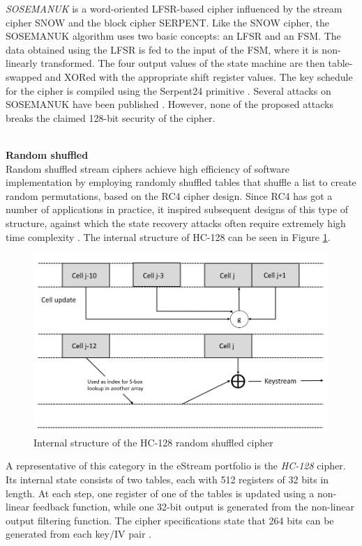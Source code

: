 \emph{SOSEMANUK} is a word-oriented LFSR-based cipher influenced by the stream cipher SNOW and the block cipher SERPENT. Like the SNOW cipher, the SOSEMANUK algorithm uses two basic concepts: an LFSR and an FSM. The data obtained using the LFSR is fed to the input of the FSM, where it is non-linearly transformed. The four output values of the state machine are then table-swapped and XORed with the appropriate shift register values. The key schedule for the cipher is compiled using the Serpent24 primitive \cite{berbain2008sosemanuk}. Several attacks on SOSEMANUK have been published \cite{tsunoo2006evaluation} \cite{lee2008cryptanalysis}. However, none of the proposed attacks breaks the claimed 128-bit security of the cipher. \\\\

\clearpage

\textbf{Random shuffled} \\

Random shuffled stream ciphers achieve high efficiency of software implementation by employing randomly shuffled tables that shuffle a list to create random permutations, based on the RC4 cipher design. Since RC4 has got a number of applications in practice, it inspired subsequent designs of this type of structure, against which the state recovery attacks often require extremely high time complexity \cite{jiao2020stream}. The internal structure of HC-128 can be seen in Figure \ref{fig:random-shuffled}.

\begin{figure}[h]
	\vspace{0.2cm}
	\centering
	\includegraphics[width=.5\textwidth]{img/hc-128.png}
	\caption{Internal structure of the HC-128 random shuffled cipher \cite{Raizada2015SomeRO}}
	\label{fig:random-shuffled}
	\vspace{0.3cm}
\end{figure}

A representative of this category in the eStream portfolio is the \emph{HC-128} cipher. Its internal state consists of two tables, each with 512 registers of 32 bits in length. At each step, one register of one of the tables is updated using a non-linear feedback function, while one 32-bit output is generated from the non-linear output filtering function. The cipher specifications state that 264 bits can be generated from each key/IV pair \cite{wu2008stream}. \\

